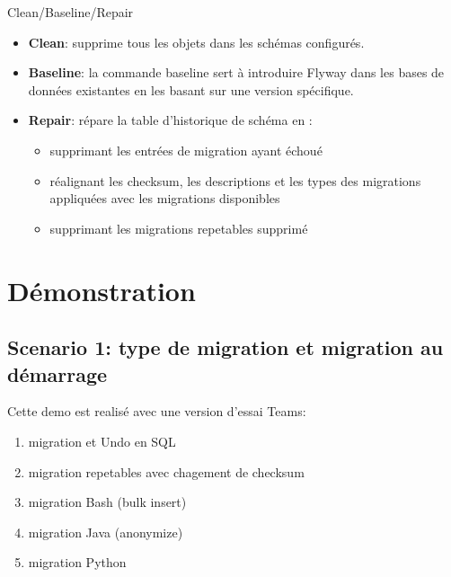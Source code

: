 \documentclass[slidestop,compress,11pt,xcolor=dvipsnames,french]{beamer}
\begin{document}
\begin{frame}{Clean/Baseline/Repair}
\vspace{1cm}
\begin{itemize}
 \item \textbf{Clean}: supprime tous les objets dans les schémas configurés.
 \item \textbf{Baseline}: la commande baseline sert à introduire Flyway dans les bases de données existantes en les basant sur une version spécifique.
 \item \textbf{Repair}: répare la table d'historique de schéma en :
    \begin{itemize}
        \item supprimant les entrées de migration ayant échoué
        \item réalignant les checksum, les descriptions et les types des migrations appliquées avec les migrations disponibles
        \item supprimant les migrations repetables supprimé
    \end{itemize}
\end{itemize}
\end{frame}

\section[Démo]{Démonstration}
\subsection*{Scenario 1: type de migration et migration au démarrage}
\begin{frame}
Cette demo est realisé avec une version d'essai Teams: 
\begin{enumerate}
 \item migration et Undo en SQL 
 \item migration repetables avec chagement de checksum
 \item migration Bash (bulk insert)
 \item migration Java (anonymize)
 \item migration Python 
\end{enumerate}
\end{frame}
\end{document}
